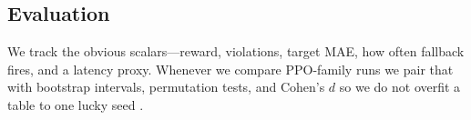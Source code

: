 \subsection{Evaluation}

We track the obvious scalars---reward, violations, target MAE, how often fallback fires, and a latency proxy. Whenever we compare PPO-family runs we pair that with bootstrap intervals, permutation tests, and Cohen's $d$ so we do not overfit a table to one lucky seed \cite{efron1994introduction,good2005permutation}.